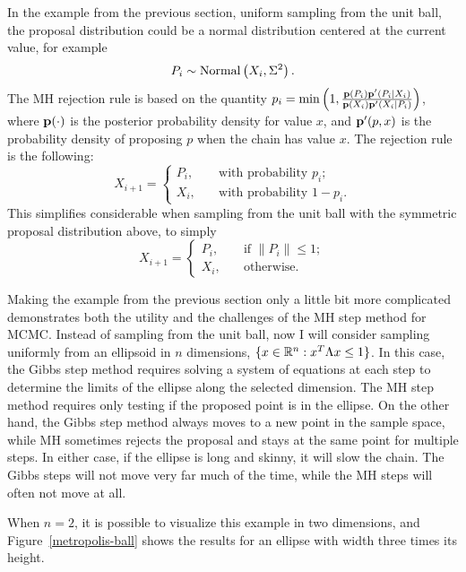 In the example from the previous section, uniform sampling from the
unit ball, the proposal distribution could be a normal distribution
centered at the current value, for example
\[
P_i \sim \operatorname{Normal}\left(X_i, \Sigma^2\right).
\]
The MH rejection rule is based on the quantity $p_i =
\min\left(1, \frac{\mathbf{p}(P_i)\mathbf{p}'(P_i|X_i)}{\mathbf{p}(X_i)\mathbf{p}'(X_i|P_i)}\right)$, where
$\mathbf{p}(\cdot)$ is the posterior probability density for value $x$, and
$\mathbf{p}'(p, x)$ is the probability density of proposing $p$ when the
chain has value $x$.  The rejection rule is the following:
\[
X_{i+1} = \begin{cases}
P_i, &\quad\text{with probability } p_i;\\
X_i, &\quad\text{with probability } 1-p_i.
\end{cases}
\]
This simplifies considerable when sampling from the unit ball with the
symmetric proposal distribution above, to simply
\[
X_{i+1} = \begin{cases}
P_i , &\quad\text{if }\|P_i\| \leq 1;\\
X_i, &\quad\text{otherwise}.
\end{cases}
\]

Making the example from the previous section only a little bit more
complicated demonstrates both the utility and the challenges of the MH
step method for MCMC.  Instead of sampling from the unit ball, now I
will consider sampling uniformly from an ellipsoid in $n$ dimensions,
$\{x\in \mathbb{R}^n : x^T \Lambda x \leq 1\}$.  In this case, the Gibbs
step method requires solving a system of equations at each step to
determine the limits of the ellipse along the selected dimension.  The
MH step method requires only testing if the proposed point is in the
ellipse.  On the other hand, the Gibbs step method always moves to a
new point in the sample space, while MH sometimes rejects the proposal
and stays at the same point for multiple steps.  In either case, if
the ellipse is long and skinny, it will slow the chain.  The Gibbs
steps will not move very far much of the time, while the MH steps will
often not move at all.

When $n=2$, it is possible to visualize this example in two
dimensions, and Figure~\ref{metropolis-ball} shows the results for an
ellipse with width three times its height.


